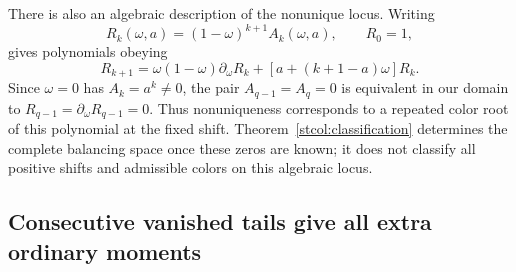 There is also an algebraic description of the nonunique locus.
Writing
\begin{equation}\label{stcol:numerator}
 R_k(\omega,a)=(1-\omega)^{k+1}A_k(\omega,a),\qquad R_0=1,
\end{equation}
gives polynomials obeying
\begin{equation}\label{stcol:numerator-recurrence}
 R_{k+1}=\omega(1-\omega)\partial_\omega R_k
           +[a+(k+1-a)\omega]R_k.
\end{equation}
Since $\omega=0$ has $A_k=a^k\ne0$, the pair $A_{q-1}=A_q=0$
is equivalent in our domain to
$R_{q-1}=\partial_\omega R_{q-1}=0$.
Thus nonuniqueness corresponds to a repeated color root of this
polynomial at the fixed shift.  Theorem~\ref{stcol:classification}
determines the complete balancing space once these zeros are known;
it does not classify all positive shifts and admissible colors on
this algebraic locus.

\subsection{Consecutive vanished tails give all extra ordinary moments}

